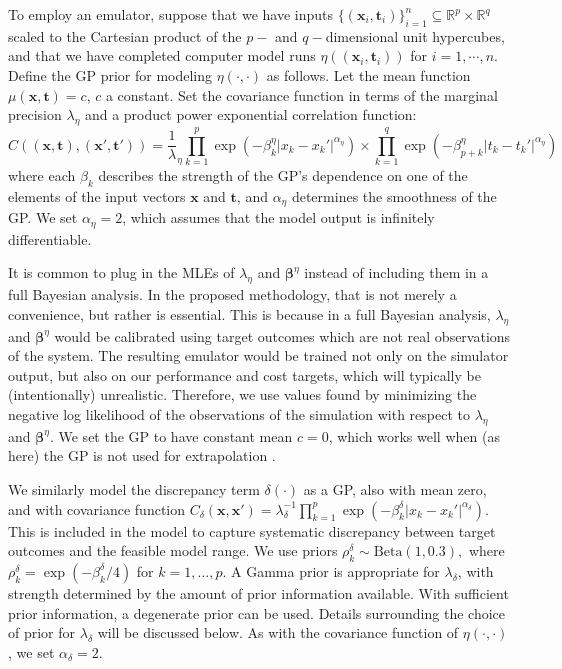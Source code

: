 \documentclass[12pt]{article}
\begin{document}
To employ an emulator, suppose that we have inputs $\{(\mathbf x_i,\mathbf t_i)\}_{i=1}^n\subseteq \mathbb R^p\times \mathbb R^q$ scaled to the Cartesian product of the $p-$ and $q-$dimensional unit hypercubes, and that we have completed computer model runs 
%
$\eta\left((\mathbf x_i,\mathbf t_i)\right)$ for $i=1,\cdots,n.$
%
Define the GP prior for modeling $\eta(\cdot,\cdot)$ as follows. 
%
Let the mean function $\mu(\mathbf x,\mathbf t)=c$, $c$ a constant. 
%
Set the covariance function in terms of the marginal precision $\lambda_\eta$ and a product power exponential correlation function:
%
\begin{equation}\label{eq:Hig_cov}
C((\mathbf x,\mathbf t),(\mathbf x',\mathbf t')) = \frac 1\lambda_\eta \prod_{k=1}^{p}
\exp \left(-\beta^\eta_k|x_k-x_k'|^{\alpha_\eta}\right) \times
\prod_{k=1}^{q}
\exp \left(-\beta^\eta_{p+k}|t_k-t_k'|^{\alpha_\eta}\right)
\end{equation}
%
where each $\beta_k$ describes the strength of the GP's dependence on one of the elements of the input vectors $\mathbf x$ and $\mathbf t$, and $\alpha_\eta$ determines the smoothness of the GP. 
%
We set $\alpha_\eta = 2$, which assumes that the model output is infinitely differentiable.

It is common to plug in the MLEs of $\lambda_\eta$ and $\boldsymbol \beta^\eta$ instead of including them in a full Bayesian analysis.
%
In the proposed methodology, that is not merely a convenience, but rather is essential.
%
This is because in a full Bayesian analysis, $\lambda_\eta$ and $\boldsymbol\beta^\eta$ would be calibrated using target outcomes which are not real observations of the system.
%
The resulting emulator would be trained not only on the simulator output, but also on our performance and cost targets, which will typically be (intentionally) unrealistic.
%
Therefore, we use values found by minimizing the negative log likelihood of the observations of the simulation with respect to $\lambda_\eta$ and $\boldsymbol\beta^\eta$.
%
We set the GP to have constant mean $c=0$, which works well when (as here) the GP is not used for extrapolation \citep{Bayarri2007}.
%

We similarly model the discrepancy term $\delta(\cdot)$ as a GP, also with mean zero, and with covariance function
%
$C_\delta(\mathbf x,\mathbf x') = \lambda_\delta^{-1} \prod_{k=1}^p
\exp\left( -\beta_k^\delta |x_k-x_k'|^{\alpha_\delta} \right).$
%
This is included in the model to capture systematic discrepancy between target outcomes and the feasible model range.
%
We use priors
$\rho^\delta_k \sim \mathrm{Beta}(1,0.3),$
where $\rho_k^\delta = \exp(-\beta_k^\delta/4)$ for $k=1,\ldots,p$. 
%
A Gamma prior is appropriate for $\lambda_\delta$, with strength determined by the amount of prior information available. 
%
With sufficient prior information, a degenerate prior can be used. 
%
Details surrounding the choice of prior for $\lambda_\delta$ will be discussed below.
%
As with the covariance function of $\eta(\cdot,\cdot)$, we set $\alpha_\delta=2$.
\end{document}
